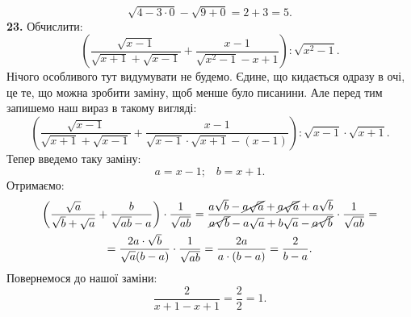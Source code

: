 $$
\sqrt{4-3\cdot0}-\sqrt{9+0}=2+3=5.
$$
\textbf{23.} Обчислити:
$$
\left(\dfrac{\sqrt{x-1}}{\sqrt{x+1}+\sqrt{x-1}}+\dfrac{x-1}{\sqrt{x^2-1}-x+1}\right):\sqrt{x^2-1}.
$$
Нічого особливого тут видумувати не будемо. Єдине, що кидається одразу в очі, це те, що можна зробити заміну, щоб менше було писанини. Але перед тим запишемо наш вираз в такому вигляді:
$$
\left(\dfrac{\sqrt{x-1}}{\sqrt{x+1}+\sqrt{x-1}}+\dfrac{x-1}{\sqrt{x-1}\cdot\sqrt{x+1}-(x-1)}\right):\sqrt{x-1}\cdot\sqrt{x+1}.
$$
Тепер введемо таку заміну:
$$
a=x-1;\;\;\;b=x+1.
$$
Отримаємо:
\begin{multline*}
\left(\dfrac{\sqrt{a}}{\sqrt{b}+\sqrt{a}}+\dfrac{b}{\sqrt{ab}-a}\right)\cdot\dfrac{1}{\sqrt{ab}}=
\dfrac{a\sqrt{b}-\cancel{a\sqrt{a}}+\cancel{a\sqrt{a}}+a\sqrt{b}}{\cancel{a\sqrt{b}}-a\sqrt{a}+b\sqrt{a}-\cancel{a\sqrt{b}}}\cdot\dfrac{1}{\sqrt{ab}}=\\
=\dfrac{2a\cdot\sqrt{b}}{\sqrt{a}(b-a)}\cdot\dfrac{1}{\sqrt{ab}}=
\dfrac{2a}{a\cdot(b-a)}=\dfrac{2}{b-a}.
\end{multline*}
Повернемося до нашої заміни:
$$
\dfrac{2}{x+1-x+1}=\dfrac{2}{2}=1.
$$